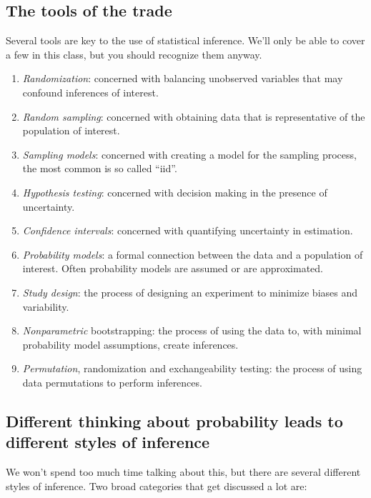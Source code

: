 \documentclass[]{article}
\begin{document}
\subsection{The tools of the trade}\label{the-tools-of-the-trade}

Several tools are key to the use of statistical inference. We'll only be
able to cover a few in this class, but you should recognize them anyway.

\begin{enumerate}
\def\labelenumi{\arabic{enumi}.}
\itemsep1pt\parskip0pt
\item
  \emph{Randomization}: concerned with balancing unobserved variables
  that may confound inferences of interest.
\item
  \emph{Random sampling}: concerned with obtaining data that is
  representative of the population of interest.
\item
  \emph{Sampling models}: concerned with creating a model for the
  sampling process, the most common is so called ``iid''.
\item
  \emph{Hypothesis testing}: concerned with decision making in the
  presence of uncertainty.
\item
  \emph{Confidence intervals}: concerned with quantifying uncertainty in
  estimation.
\item
  \emph{Probability models}: a formal connection between the data and a
  population of interest. Often probability models are assumed or are
  approximated.
\item
  \emph{Study design}: the process of designing an experiment to
  minimize biases and variability.
\item
  \emph{Nonparametric} bootstrapping: the process of using the data to,
  with minimal probability model assumptions, create inferences.
\item
  \emph{Permutation}, randomization and exchangeability testing: the
  process of using data permutations to perform inferences.
\end{enumerate}

\subsection{Different thinking about probability leads to different
styles of
inference}\label{different-thinking-about-probability-leads-to-different-styles-of-inference}

We won't spend too much time talking about this, but there are several
different styles of inference. Two broad categories that get discussed a
lot are:
\end{document}
